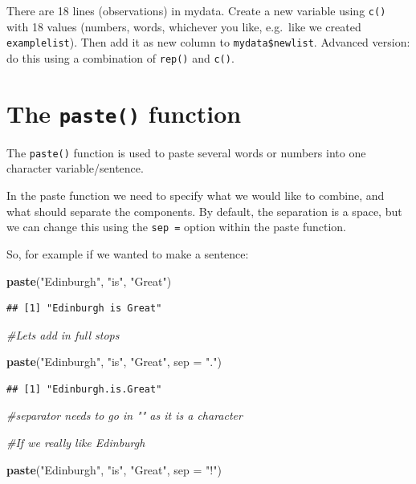 \documentclass[]{book}
\makeatletter
\newenvironment{Shaded}{\begin{snugshade}}{\end{snugshade}}
\newcommand{\KeywordTok}[1]{\textcolor[rgb]{0.13,0.29,0.53}{\textbf{#1}}}
\newcommand{\DataTypeTok}[1]{\textcolor[rgb]{0.13,0.29,0.53}{#1}}
\newcommand{\StringTok}[1]{\textcolor[rgb]{0.31,0.60,0.02}{#1}}
\newcommand{\CommentTok}[1]{\textcolor[rgb]{0.56,0.35,0.01}{\textit{#1}}}
\newcommand{\NormalTok}[1]{#1}
\newenvironment{kframe}{%
\medskip{}
\setlength{\fboxsep}{.8em}
 \def\at@end@of@kframe{}%
 \ifinner\ifhmode%
  \def\at@end@of@kframe{\end{minipage}}%
  \begin{minipage}{\columnwidth}%
 \fi\fi%
 \def\FrameCommand##1{\hskip\@totalleftmargin \hskip-\fboxsep
 \colorbox{shadecolor}{##1}\hskip-\fboxsep
     \hskip-\linewidth \hskip-\@totalleftmargin \hskip\columnwidth}%
 \MakeFramed {\advance\hsize-\width
   \@totalleftmargin\z@ \linewidth\hsize
   \@setminipage}}%
 {\par\unskip\endMakeFramed%
 \at@end@of@kframe}
\renewenvironment{Shaded}{\begin{kframe}}{\end{kframe}}
\makeatother
\begin{document}
There are 18 lines (observations) in mydata. Create a new variable using
\texttt{c()} with 18 values (numbers, words, whichever you like,
e.g.~like we created \texttt{examplelist}). Then add it as new column to
\texttt{mydata\$newlist}. Advanced version: do this using a combination
of \texttt{rep()} and \texttt{c()}.

\newpage

\section{\texorpdfstring{The \texttt{paste()}
function}{The paste() function}}\label{the-paste-function}

The \texttt{paste()} function is used to paste several words or numbers
into one character variable/sentence.

In the paste function we need to specify what we would like to combine,
and what should separate the components. By default, the separation is a
space, but we can change this using the \texttt{sep\ =} option within
the paste function.

So, for example if we wanted to make a sentence:

\begin{Shaded}
\begin{Highlighting}[]
\KeywordTok{paste}\NormalTok{(}\StringTok{"Edinburgh"}\NormalTok{, }\StringTok{"is"}\NormalTok{, }\StringTok{"Great"}\NormalTok{)}
\end{Highlighting}
\end{Shaded}

\begin{verbatim}
## [1] "Edinburgh is Great"
\end{verbatim}

\begin{Shaded}
\begin{Highlighting}[]
\CommentTok{#Lets add in full stops}

\KeywordTok{paste}\NormalTok{(}\StringTok{"Edinburgh"}\NormalTok{, }\StringTok{"is"}\NormalTok{, }\StringTok{"Great"}\NormalTok{, }\DataTypeTok{sep =} \StringTok{"."}\NormalTok{)}
\end{Highlighting}
\end{Shaded}

\begin{verbatim}
## [1] "Edinburgh.is.Great"
\end{verbatim}

\begin{Shaded}
\begin{Highlighting}[]
\CommentTok{#separator needs to go in "" as it is a character}

\CommentTok{#If we really like Edinburgh}

\KeywordTok{paste}\NormalTok{(}\StringTok{"Edinburgh"}\NormalTok{, }\StringTok{"is"}\NormalTok{, }\StringTok{"Great"}\NormalTok{, }\DataTypeTok{sep =} \StringTok{"!"}\NormalTok{)}
\end{Highlighting}
\end{Shaded}
\end{document}
